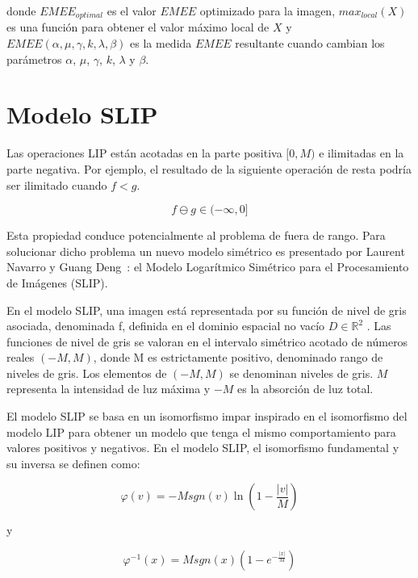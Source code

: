 donde $EMEE_{optimal}$ es el valor $EMEE$ optimizado para la imagen, $max_{local}(X)$ es una función para obtener el valor máximo local de $X$ y $EMEE(\alpha, \mu, \gamma, k, \lambda, \beta)$ es la medida $EMEE$ resultante cuando cambian los parámetros $\alpha$, $\mu$, $\gamma$, $k$, $\lambda$ y $\beta$.

\section{Modelo SLIP}

Las operaciones LIP están acotadas en la parte positiva $[0, M )$ e ilimitadas en la parte negativa. Por ejemplo, el resultado de la siguiente operación de resta podría ser ilimitado cuando $f < g$.

\begin{equation}
	f \ominus g \in (-\infty,0]
\end{equation}

Esta propiedad conduce potencialmente al problema de fuera de rango. Para solucionar dicho problema un nuevo modelo sim\'etrico es presentado por Laurent Navarro y Guang Deng~\cite{navarro2013symmetric}: el Modelo Logar\'itmico Sim\'etrico para el Procesamiento de Im\'agenes (SLIP). 

En el modelo SLIP, una imagen está representada por su función de nivel de gris asociada, denominada f, definida en el dominio espacial no vacío $D \in \mathbb{R}^2$ . Las funciones de nivel de gris se valoran en el intervalo simétrico acotado de números reales $(-M, M)$, donde M es estrictamente positivo, denominado rango de niveles de gris. Los elementos de $(-M, M )$ se denominan niveles de gris. $M$ representa la intensidad de luz máxima y $-M$ es la absorción de luz total.

El modelo SLIP se basa en un isomorfismo impar inspirado en el isomorfismo del modelo LIP para obtener un modelo que tenga el mismo comportamiento para valores positivos y negativos. En el modelo SLIP, el isomorfismo fundamental y su inversa se definen como:

\begin{equation}
	\varphi(v)=-Msgn(v)\ln\left(1-\frac{|v|}{M}\right)
\end{equation}

y

\begin{equation}
	\varphi^{-1}(x)=Msgn(x)\left(1-e^{-\frac{|x|}{M}}\right)
\end{equation}

